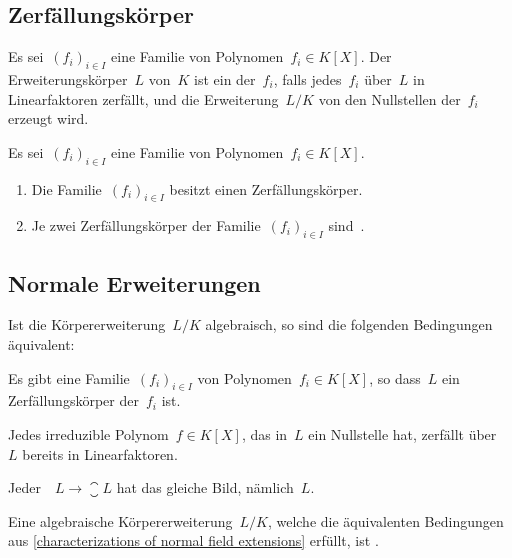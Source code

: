 \subsection{Zerfällungskörper}

\begin{definition}
  Es sei~$(f_i)_{i \in I}$ eine Familie von Polynomen~$f_i \in K[X]$.
  Der Erweiterungskörper~$L$ von~$K$ ist ein  der~$f_i$, falls jedes~$f_i$ über~$L$ in Linearfaktoren zerfällt, und die Erweiterung~$L/K$ von den Nullstellen der~$f_i$ erzeugt wird.
\end{definition}

\begin{proposition}
  Es sei~$(f_i)_{i \in I}$ eine Familie von Polynomen~$f_i \in K[X]$.
  \begin{enumerate}
    \item
      Die Familie~$(f_i)_{i \in I}$ besitzt einen Zerfällungskörper.
    \item
      Je zwei Zerfällungskörper der Familie~$(f_i)_{i \in I}$ sind~.
  \end{enumerate}
\end{proposition}



\subsection{Normale Erweiterungen}

\begin{proposition}
  \label{characterizations of normal field extensions}
  Ist die Körpererweiterung~$L/K$ algebraisch, so sind die folgenden Bedingungen äquivalent:
  \begin{equivlist}
    \item
      Es gibt eine Familie~$(f_i)_{i \in I}$ von Polynomen~$f_i \in K[X]$, so dass~$L$ ein Zerfällungskörper der~$f_i$ ist.
    \item
      Jedes irreduzible Polynom~$f \in K[X]$, das in~$L$ ein Nullstelle hat, zerfällt über~$L$ bereits in Linearfaktoren.
    \item
      Jeder~~$L \to \closure{L}$ hat das gleiche Bild, nämlich~$L$.
  \end{equivlist}
\end{proposition}

\begin{definition}
  Eine algebraische Körpererweiterung~$L/K$, welche die äquivalenten Bedingungen aus \cref{characterizations of normal field extensions} erfüllt, ist .
\end{definition}

